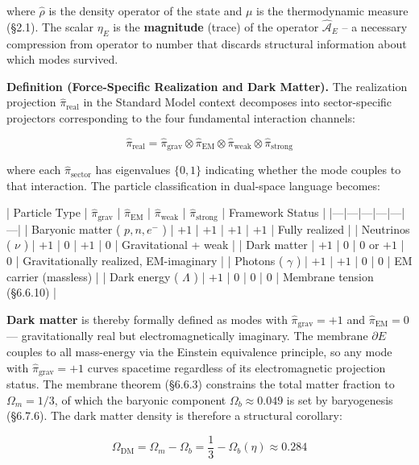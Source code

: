 \documentclass[11pt,a4paper]{article}
\theoremstyle{definition}
\theoremstyle{remark}
\begin{document}
where $\hat{\rho}$ is the density operator of the state and $\mu$ is the thermodynamic measure (\S 2.1). The scalar $\eta_E$ is the \textbf{magnitude} (trace) of the operator $\hat{\mathcal{A}}_E$ -- a necessary compression from operator to number that discards structural information about which modes survived.

\textbf{Definition (Force-Specific Realization and Dark Matter).} The realization projection $\hat{\pi}_{\text{real}}$ in the Standard Model context decomposes into sector-specific projectors corresponding to the four fundamental interaction channels:


\begin{equation}
\hat{\pi}_{\text{real}} = \hat{\pi}_{\text{grav}} \otimes \hat{\pi}_{\text{EM}} \otimes \hat{\pi}_{\text{weak}} \otimes \hat{\pi}_{\text{strong}}
\end{equation}


where each $\hat{\pi}_{\text{sector}}$ has eigenvalues $\{0, 1\}$ indicating whether the mode couples to that interaction. The particle classification in dual-space language becomes:

| Particle Type | $\hat{\pi}_{\text{grav}}$ | $\hat{\pi}_{\text{EM}}$ | $\hat{\pi}_{\text{weak}}$ | $\hat{\pi}_{\text{strong}}$ | Framework Status |
|---|---|---|---|---|---|
| Baryonic matter ( $p, n, e^-$ ) | $+1$ | $+1$ | $+1$ | $+1$ | Fully realized |
| Neutrinos ( $\nu$ ) | $+1$ | $0$ | $+1$ | $0$ | Gravitational + weak |
| Dark matter | $+1$ | $0$ | $0$ or $+1$ | $0$ | Gravitationally realized, EM-imaginary |
| Photons ( $\gamma$ ) | $+1$ | $+1$ | $0$ | $0$ | EM carrier (massless) |
| Dark energy ( $\Lambda$ ) | $+1$ | $0$ | $0$ | $0$ | Membrane tension (\S 6.6.10) |

\textbf{Dark matter} is thereby formally defined as modes with $\hat{\pi}_{\text{grav}} = +1$ and $\hat{\pi}_{\text{EM}} = 0$ — gravitationally real but electromagnetically imaginary. The membrane $\partial E$ couples to all mass-energy via the Einstein equivalence principle, so any mode with $\hat{\pi}_{\text{grav}} = +1$ curves spacetime regardless of its electromagnetic projection status. The membrane theorem (\S 6.6.3) constrains the total matter fraction to $\Omega_m = 1/3$, of which the baryonic component $\Omega_b \approx 0.049$ is set by baryogenesis (\S 6.7.6). The dark matter density is therefore a structural corollary:


\begin{equation}
\boxed{\Omega_{\text{DM}} = \Omega_m - \Omega_b = \frac{1}{3} - \Omega_b(\eta) \approx 0.284}
\end{equation}
\end{document}
